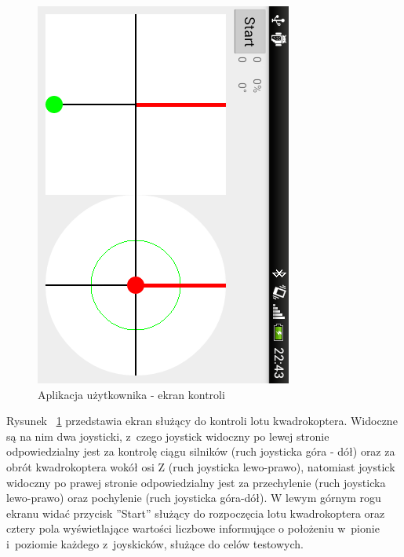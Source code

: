 \begin{figure}[H]
	\centering
	\includegraphics[scale=0.6, angle=90]{Pictures/DroidAtScreen/droid@screen-4.png}
	\caption[Aplikacja użytkownika - ekran kontroli]{Aplikacja użytkownika - ekran kontroli}
	\label{fig:QuadroControl_screen4}
\end{figure}

Rysunek ~\ref{fig:QuadroControl_screen4} przedstawia ekran służący do kontroli lotu kwadrokoptera. Widoczne są na nim dwa joysticki, z~czego joystick widoczny po lewej stronie odpowiedzialny jest za kontrolę ciągu silników (ruch joysticka góra - dół) oraz za obrót kwadrokoptera wokół osi Z (ruch joysticka lewo-prawo), natomiast joystick widoczny po prawej stronie odpowiedzialny jest za przechylenie (ruch joysticka lewo-prawo) oraz pochylenie (ruch joysticka góra-dół). W lewym górnym rogu ekranu widać przycisk ''Start'' służący do rozpoczęcia lotu kwadrokoptera oraz cztery pola wyświetlające wartości liczbowe informujące o położeniu w~pionie i~poziomie każdego z~joyskicków, służące do celów testowych.


